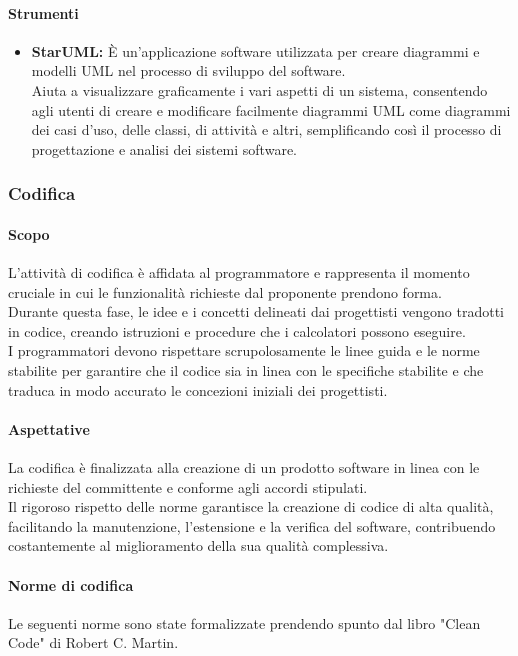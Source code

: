 \documentclass{article}
\begin{document}
\paragraph{Strumenti}
\begin{itemize}
    \item \textbf{StarUML:} 
    È un'applicazione software utilizzata per creare diagrammi e modelli UML nel processo di sviluppo del software. \\
    Aiuta a visualizzare graficamente i vari aspetti di un sistema, consentendo agli utenti di creare e modificare facilmente diagrammi UML come diagrammi dei casi d'uso, delle classi, di attività e altri, semplificando così il processo di progettazione e analisi dei sistemi software.
\end{itemize}

\subsubsection{Codifica}
\paragraph{Scopo}
L'attività di codifica è affidata al programmatore e rappresenta il momento cruciale in cui le funzionalità richieste dal proponente prendono forma. \\
Durante questa fase, le idee e i concetti delineati dai progettisti vengono tradotti in codice, creando istruzioni e procedure che i calcolatori possono eseguire. \\
I programmatori devono rispettare scrupolosamente le linee guida e le norme stabilite per garantire che il codice sia in linea con le specifiche stabilite e che traduca in modo accurato le concezioni iniziali dei progettisti.
\paragraph{Aspettative}
La codifica è finalizzata alla creazione di un prodotto software in linea con le richieste del committente e conforme agli accordi stipulati.\\
Il rigoroso rispetto delle norme garantisce la creazione di codice di alta qualità, facilitando la manutenzione, l'estensione e la verifica del software, contribuendo costantemente al miglioramento della sua qualità complessiva.
\paragraph{Norme di codifica}
Le seguenti norme sono state formalizzate prendendo spunto dal libro "Clean Code" di Robert C. Martin.
\end{document}
